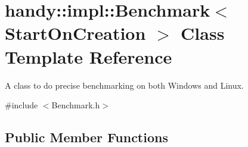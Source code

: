 \hypertarget{classhandy_1_1impl_1_1Benchmark}{}\section{handy\+:\+:impl\+:\+:Benchmark$<$ Start\+On\+Creation $>$ Class Template Reference}
\label{classhandy_1_1impl_1_1Benchmark}


A class to do precise benchmarking on both Windows and Linux.  




{\ttfamily \#include $<$Benchmark.\+h$>$}

\subsection*{Public Member Functions}
